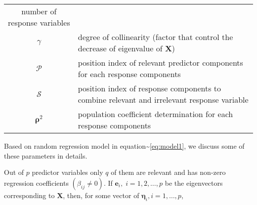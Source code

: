 \documentclass[12pt,A4paper,authoryear]{elsarticle} %
\begin{document}
\begin{longtable}[]{@{}cl@{}}
\begin{minipage}[t]{0.75\columnwidth}
number of response variables\strut
\end{minipage}\tabularnewline
\begin{minipage}[t]{0.19\columnwidth}\centering\strut
\(\gamma\)\strut
\end{minipage} & \begin{minipage}[t]{0.75\columnwidth}\raggedright\strut
degree of collinearity (factor that control the decrease of eigenvalue
of \(\mathbf{X}\))\strut
\end{minipage}\tabularnewline
\begin{minipage}[t]{0.19\columnwidth}\centering\strut
\(\mathcal{P}\)\strut
\end{minipage} & \begin{minipage}[t]{0.75\columnwidth}\raggedright\strut
position index of relevant predictor components for each response
components\strut
\end{minipage}\tabularnewline
\begin{minipage}[t]{0.19\columnwidth}\centering\strut
\(\mathcal{S}\)\strut
\end{minipage} & \begin{minipage}[t]{0.75\columnwidth}\raggedright\strut
position index of response components to combine relevant and irrelevant
response variable\strut
\end{minipage}\tabularnewline
\begin{minipage}[t]{0.19\columnwidth}\centering\strut
\(\boldsymbol{\rho}^2\)\strut
\end{minipage} & \begin{minipage}[t]{0.75\columnwidth}\raggedright\strut
population coefficient determination for each response components\strut
\end{minipage}\tabularnewline
\bottomrule
\end{longtable}

Based on random regression model in
equation\textasciitilde{}\eqref{eq:model1}, we discuss some of these
parameters in details.

Out of \(p\) predictor variables only \(q\) of them are relevant and has
non-zero regression coefficients \((\beta_{ij} \ne 0)\). If
\(\boldsymbol{e}_i, \; i = 1, 2, \ldots, p\) be the eigenvectors
corresponding to \(\mathbf{X}\), then, for some vector of
\(\boldsymbol{\eta}_i, i = 1, \ldots, p\),
\end{document}
